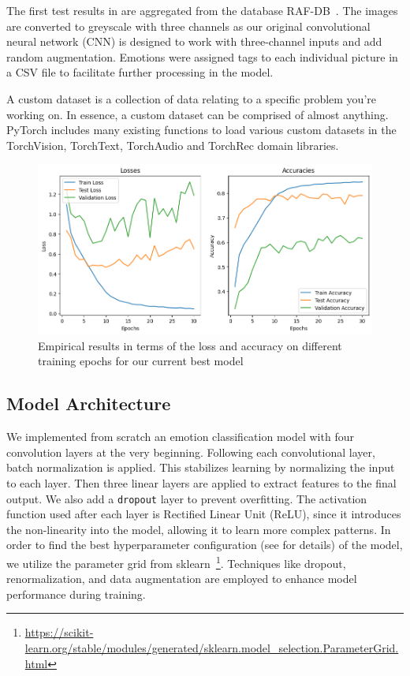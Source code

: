 The first test results in  are aggregated from the database RAF-DB~\cite{li_reliable_2017,li2019reliable}. 
The images are converted to greyscale with three channels as our original convolutional neural network (CNN) is designed to work with three-channel inputs and add random augmentation. 
Emotions were assigned tags to each individual picture in a CSV file to facilitate further processing in the model.

A custom dataset is a collection of data relating to a specific problem you're working on.
In essence, a custom dataset can be comprised of almost anything.
PyTorch includes many existing functions to load various custom datasets in the TorchVision, TorchText, TorchAudio and TorchRec domain libraries.


\begin{figure}[ht]
  \centering
   \includegraphics[width=\linewidth]{output.png}
   \caption{Empirical results in terms of the loss and accuracy on different training epochs for our current best model} %
   \label{fig:result}
\end{figure}

\subsection{Model Architecture}
We implemented from scratch an emotion classification model with four convolution layers at the very beginning. 
Following each convolutional layer, 
batch normalization is applied. 
This stabilizes learning by normalizing the input to each layer. 
Then three linear layers are applied to extract features to the final output. 
We also add a \texttt{dropout} layer to prevent overfitting. 
The activation function used after each layer is Rectified Linear Unit (ReLU), 
since it introduces the non-linearity into the model, 
allowing it to learn more complex patterns. 
In order to find the best hyperparameter configuration (see  for details) of the model, 
we utilize the parameter grid from sklearn~\footnote{\url{https://scikit-learn.org/stable/modules/generated/sklearn.model_selection.ParameterGrid.html}}.
Techniques like dropout, renormalization, and data augmentation are employed to enhance model performance during training.

